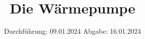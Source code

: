 

\subject{V206}
\title{Die Wärmepumpe}
\date{%
  Durchführung: 09.01.2024
  \hspace{3em}
  Abgabe: 16.01.2024
}



\maketitle
\thispagestyle{empty}
\tableofcontents
\newpage






\printbibliography{}



